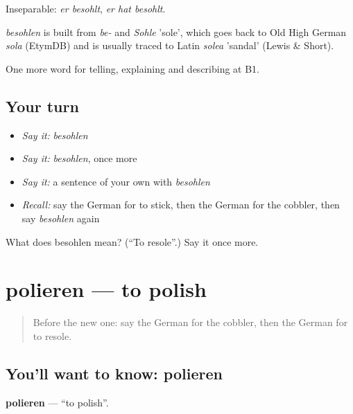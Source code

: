 Inseparable: \emph{er besohlt}, \emph{er hat besohlt}.

\begin{cousinweb}
\emph{besohlen} is built from \emph{be-} and \emph{Sohle} 'sole', which goes back to Old High German \emph{sola} (EtymDB) and is usually traced to Latin \emph{solea} 'sandal' (Lewis \& Short).
\end{cousinweb}

\begin{grammarlens}[title={What you've built}]
One more word for telling, explaining and describing at B1.
\end{grammarlens}

\subsection*{Your turn}
\begin{itemize}
\raggedright
  \item \emph{Say it:} \emph{besohlen}
  \item \emph{Say it:} \emph{besohlen}, once more
  \item \emph{Say it:} a sentence of your own with \emph{besohlen}
  \item \emph{Recall:} say the German for to stick, then the German for the cobbler, then say \emph{besohlen} again
\end{itemize}

\begin{tcolorbox}[breakable,colback=teal!4,colframe=teal!35!black,title={Before you move on}]
What does besohlen mean? (\textquotedblleft{}To resole\textquotedblright{}.) Say it once more.
\end{tcolorbox}
\section[polieren]{polieren — to polish}

\label{lesson:GE-C445-polieren}



\begin{quote}
Before the new one: say the German for the cobbler, then the German for to resole.
\end{quote}

\subsection*{You'll want to know: polieren}
\textbf{polieren} — \textquotedblleft{}to polish\textquotedblright{}.

